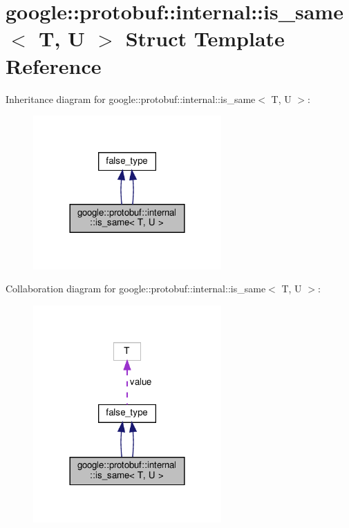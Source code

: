 \hypertarget{structgoogle_1_1protobuf_1_1internal_1_1is__same}{}\section{google\+:\+:protobuf\+:\+:internal\+:\+:is\+\_\+same$<$ T, U $>$ Struct Template Reference}
\label{structgoogle_1_1protobuf_1_1internal_1_1is__same}


Inheritance diagram for google\+:\+:protobuf\+:\+:internal\+:\+:is\+\_\+same$<$ T, U $>$\+:
\nopagebreak
\begin{figure}[H]
\begin{center}
\leavevmode
\includegraphics[width=204pt]{structgoogle_1_1protobuf_1_1internal_1_1is__same__inherit__graph}
\end{center}
\end{figure}


Collaboration diagram for google\+:\+:protobuf\+:\+:internal\+:\+:is\+\_\+same$<$ T, U $>$\+:
\nopagebreak
\begin{figure}[H]
\begin{center}
\leavevmode
\includegraphics[width=204pt]{structgoogle_1_1protobuf_1_1internal_1_1is__same__coll__graph}
\end{center}
\end{figure}
